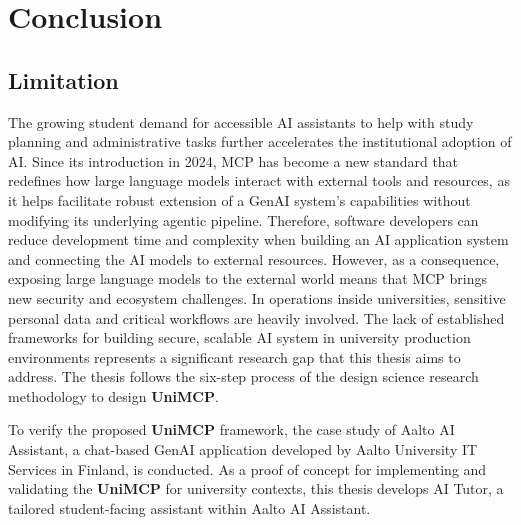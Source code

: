 \documentclass[english, 12pt, a4paper, elec, utf8, a-2b, online]{aaltothesis}
\newcommand{\UniMCP}{\textbf{UniMCP}\xspace}
\begin{document}
\clearpage
\section{Conclusion}
\label{chap:conclusion}
\subsection{Limitation}


The growing student demand for accessible AI assistants to help with study planning and administrative tasks further accelerates the institutional adoption of AI. 
Since its introduction in 2024, MCP has become a new standard that redefines how large language models interact with external tools and resources, as it helps facilitate robust extension of a GenAI system's capabilities without modifying its underlying agentic pipeline.
Therefore, software developers can reduce development time and complexity when building an AI application system and connecting the AI models to external resources.
However, as a consequence, exposing large language models to the external world means that MCP brings new security and ecosystem challenges.
In operations inside universities, sensitive personal data and critical workflows are heavily involved. 
The lack of established frameworks for building secure, scalable AI system in university production environments represents a significant research gap that this thesis aims to address.
The thesis follows the six-step process of the design science research methodology to design \UniMCP.


To verify the proposed \UniMCP framework, the case study of Aalto AI Assistant, a chat-based GenAI application developed by Aalto University IT Services in Finland, is conducted.
As a proof of concept for implementing and validating the \UniMCP for university contexts, this thesis develops AI Tutor, a tailored student-facing assistant within Aalto AI Assistant. 
\end{document}
